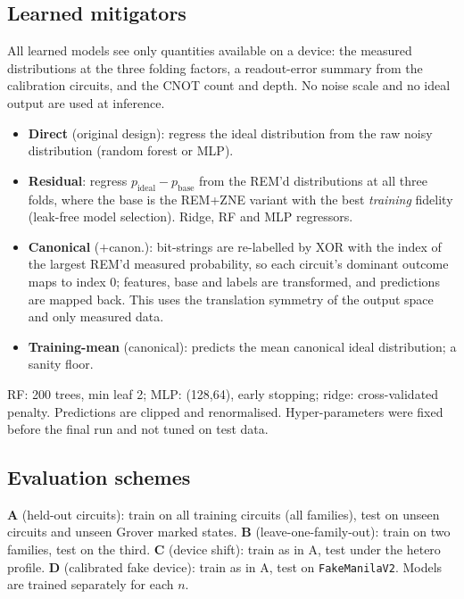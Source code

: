 \documentclass[11pt]{article}
\begin{document}
\subsection{Learned mitigators}
All learned models see only quantities available on a device: the measured distributions at the three folding factors, a readout-error summary from the calibration circuits, and the CNOT count and depth. No noise scale and no ideal output are used at inference.
\begin{itemize}
\item \textbf{Direct} (original design): regress the ideal distribution from the raw noisy distribution (random forest or MLP).
\item \textbf{Residual}: regress $p_{\text{ideal}}-p_{\text{base}}$ from the REM'd distributions at all three folds, where the base is the REM+ZNE variant with the best \emph{training} fidelity (leak-free model selection). Ridge, RF and MLP regressors.
\item \textbf{Canonical} ($+$canon.): bit-strings are re-labelled by XOR with the index of the largest REM'd measured probability, so each circuit's dominant outcome maps to index 0; features, base and labels are transformed, and predictions are mapped back. This uses the translation symmetry of the output space and only measured data.
\item \textbf{Training-mean} (canonical): predicts the mean canonical ideal distribution; a sanity floor.
\end{itemize}
RF: 200 trees, min leaf 2; MLP: (128,64), early stopping; ridge: cross-validated penalty. Predictions are clipped and renormalised. Hyper-parameters were fixed before the final run and not tuned on test data.

\subsection{Evaluation schemes}
\textbf{A} (held-out circuits): train on all training circuits (all families), test on unseen circuits and unseen Grover marked states. \textbf{B} (leave-one-family-out): train on two families, test on the third. \textbf{C} (device shift): train as in A, test under the hetero profile. \textbf{D} (calibrated fake device): train as in A, test on \texttt{FakeManilaV2}. Models are trained separately for each $n$.
\end{document}
